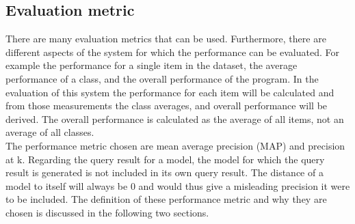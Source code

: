 \documentclass{bigdata}
\begin{document}
\subsection{Evaluation metric}
There are many evaluation metrics that can be used. Furthermore, there are different aspects of the system for which the performance can be evaluated. For example the performance for a single item in the dataset, the average performance of a class, and the overall performance of the program. In the evaluation of this system the performance for each item will be calculated and from those measurements the class averages, and overall performance will be derived. The overall performance is calculated as the average of all items, not an average of all classes.\\
The performance metric chosen are mean average precision (MAP) and precision at k. Regarding the query result for a model, the model for which the query result is generated is not included in its own query result. The distance of a model to itself will always be 0 and would thus give a misleading precision it were to be included. The definition of these performance metric and why they are chosen is discussed in the following two sections.
\end{document}
